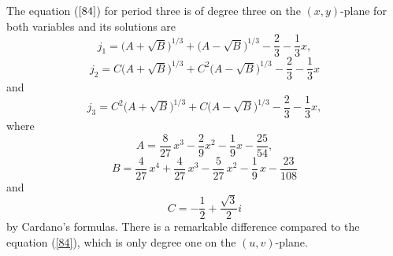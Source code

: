 \documentclass[12pt,a4paper]{amsart}
\numberwithin{equation}{section}
\numberwithin{lause}{section}
\begin{document}
 The equation ($\ref{84}$) for period three is of degree three on the $(x,y)$-plane for both variables and its solutions are
\begin{displaymath}
j_{1}=\big(A+\sqrt{B}\big)^{1/3}+\big(A-\sqrt{B}\big)^{1/3}-\frac{2}{3}-\frac{1}{3}x,
\end{displaymath}
\begin{displaymath}
j_{2}=C\big(A+\sqrt{B}\big)^{1/3}+C^{2}\big(A-\sqrt{B}\big)^{1/3}-\frac{2}{3}-\frac{1}{3}x
\end{displaymath}
and
\begin{displaymath}
j_{3}=C^{2}\big(A+\sqrt{B}\big)^{1/3}+C\big(A-\sqrt{B}\big)^{1/3}-\frac{2}{3}-\frac{1}{3}x,
\end{displaymath}
where
\begin{displaymath}
A={\frac {8}{27}}\,{x}^{3}-\frac {2}{9}{x}^{2}-\frac {1}{9}x-{\frac {25}{54}},
\end{displaymath}
\begin{displaymath}
B={\frac {4}{27}}\,{x}^{4}+{\frac {4}{27}}\,{x}^{3}-{\frac {5}{27}}\,{x
}^{2}-\frac {1}{9}\,x-{\frac {23}{108}}
\end{displaymath}
and
\begin{displaymath}
C=-\frac{1}{2}+\frac{\sqrt{3}}{2}i
\end{displaymath}
by Cardano's formulas. There is a remarkable difference compared to the equation (\ref{84}), which is only degree one on the $(u,v)$-plane.
\end{document}
